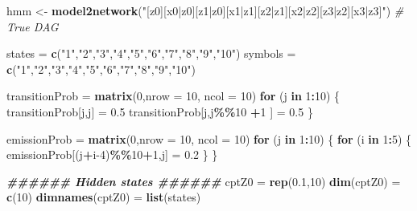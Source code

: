 \documentclass[
]{article}
\newenvironment{Shaded}{\begin{snugshade}}{\end{snugshade}}
\newcommand{\AttributeTok}[1]{\textcolor[rgb]{0.13,0.29,0.53}{#1}}
\newcommand{\CommentTok}[1]{\textcolor[rgb]{0.56,0.35,0.01}{\textit{#1}}}
\newcommand{\ControlFlowTok}[1]{\textcolor[rgb]{0.13,0.29,0.53}{\textbf{#1}}}
\newcommand{\DecValTok}[1]{\textcolor[rgb]{0.00,0.00,0.81}{#1}}
\newcommand{\DocumentationTok}[1]{\textcolor[rgb]{0.56,0.35,0.01}{\textbf{\textit{#1}}}}
\newcommand{\FloatTok}[1]{\textcolor[rgb]{0.00,0.00,0.81}{#1}}
\newcommand{\FunctionTok}[1]{\textcolor[rgb]{0.13,0.29,0.53}{\textbf{#1}}}
\newcommand{\NormalTok}[1]{#1}
\newcommand{\OtherTok}[1]{\textcolor[rgb]{0.56,0.35,0.01}{#1}}
\newcommand{\SpecialCharTok}[1]{\textcolor[rgb]{0.81,0.36,0.00}{\textbf{#1}}}
\newcommand{\StringTok}[1]{\textcolor[rgb]{0.31,0.60,0.02}{#1}}
\begin{document}
\begin{Shaded}
\begin{Highlighting}[]
\NormalTok{hmm }\OtherTok{\textless{}{-}} \FunctionTok{model2network}\NormalTok{(}\StringTok{"[z0][x0|z0][z1|z0][x1|z1][z2|z1][x2|z2][z3|z2][x3|z3]"}\NormalTok{) }\CommentTok{\# True DAG}

\NormalTok{states }\OtherTok{=} \FunctionTok{c}\NormalTok{(}\StringTok{"1"}\NormalTok{,}\StringTok{"2"}\NormalTok{,}\StringTok{"3"}\NormalTok{,}\StringTok{"4"}\NormalTok{,}\StringTok{"5"}\NormalTok{,}\StringTok{"6"}\NormalTok{,}\StringTok{"7"}\NormalTok{,}\StringTok{"8"}\NormalTok{,}\StringTok{"9"}\NormalTok{,}\StringTok{"10"}\NormalTok{)}
\NormalTok{symbols }\OtherTok{=} \FunctionTok{c}\NormalTok{(}\StringTok{"1"}\NormalTok{,}\StringTok{"2"}\NormalTok{,}\StringTok{"3"}\NormalTok{,}\StringTok{"4"}\NormalTok{,}\StringTok{"5"}\NormalTok{,}\StringTok{"6"}\NormalTok{,}\StringTok{"7"}\NormalTok{,}\StringTok{"8"}\NormalTok{,}\StringTok{"9"}\NormalTok{,}\StringTok{"10"}\NormalTok{)}

\NormalTok{transitionProb }\OtherTok{=} \FunctionTok{matrix}\NormalTok{(}\DecValTok{0}\NormalTok{,}\AttributeTok{nrow =} \DecValTok{10}\NormalTok{, }\AttributeTok{ncol =} \DecValTok{10}\NormalTok{)}
\ControlFlowTok{for}\NormalTok{ (j }\ControlFlowTok{in} \DecValTok{1}\SpecialCharTok{:}\DecValTok{10}\NormalTok{) \{}
\NormalTok{  transitionProb[j,j] }\OtherTok{=} \FloatTok{0.5}
\NormalTok{  transitionProb[j,j}\SpecialCharTok{\%\%}\DecValTok{10} \SpecialCharTok{+}\DecValTok{1}\NormalTok{ ] }\OtherTok{=} \FloatTok{0.5}
\NormalTok{\}}

\NormalTok{emissionProb }\OtherTok{=} \FunctionTok{matrix}\NormalTok{(}\DecValTok{0}\NormalTok{,}\AttributeTok{nrow =} \DecValTok{10}\NormalTok{, }\AttributeTok{ncol =} \DecValTok{10}\NormalTok{)}
\ControlFlowTok{for}\NormalTok{ (j }\ControlFlowTok{in} \DecValTok{1}\SpecialCharTok{:}\DecValTok{10}\NormalTok{) \{}
  \ControlFlowTok{for}\NormalTok{ (i }\ControlFlowTok{in} \DecValTok{1}\SpecialCharTok{:}\DecValTok{5}\NormalTok{) \{}
\NormalTok{    emissionProb[(j}\SpecialCharTok{+}\NormalTok{i}\DecValTok{{-}4}\NormalTok{)}\SpecialCharTok{\%\%}\DecValTok{10}\SpecialCharTok{+}\DecValTok{1}\NormalTok{,j] }\OtherTok{=} \FloatTok{0.2}
\NormalTok{  \}}
\NormalTok{\}}

\DocumentationTok{\#\#\#\#\#\# Hidden states \#\#\#\#\#\#}
\NormalTok{cptZ0 }\OtherTok{=} \FunctionTok{rep}\NormalTok{(}\FloatTok{0.1}\NormalTok{,}\DecValTok{10}\NormalTok{)}
\FunctionTok{dim}\NormalTok{(cptZ0) }\OtherTok{=} \FunctionTok{c}\NormalTok{(}\DecValTok{10}\NormalTok{)}
\FunctionTok{dimnames}\NormalTok{(cptZ0) }\OtherTok{=} \FunctionTok{list}\NormalTok{(states)}


\end{Highlighting}
\end{Shaded}
\end{document}
